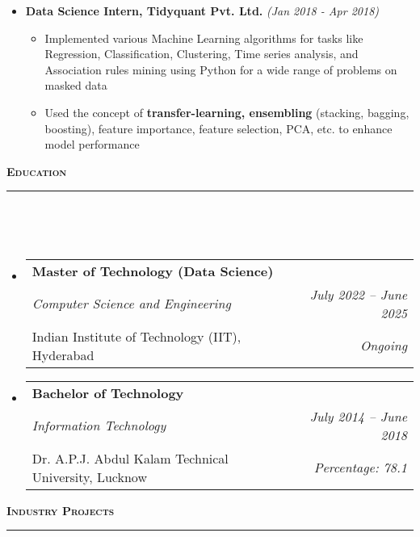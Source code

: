 \documentclass[a4paper,10pt]{article}
\makeatletter
\newcommand{\isep}{-2 pt}
\newcommand{\lsep}{-0.5cm}
\newcommand{\resheading}[1]{{\small
        {
            \begin{minipage}
                {0.992\textwidth}\textbf{{\textsc{#1 \vphantom{p\^{E}} }}}
                \\[-0.3cm]
                \hrule
            \end{minipage}
            \\[-0.5cm]
        }
 }}
\newcommand{\resEduHeading}[6]{
  \begin{tabular*}{7.1in}{l @{\extracolsep{\fill}} r}
    \textbf{\normalsize #1} \\
    \textit{#2} & \textit{#3} \\
    {\normalsize #4} & \textit{{#5} \textbf{#6}}
  \end{tabular*}
}
\makeatother
\begin{document}
\begin{itemize}
    \item \textbf{Data Science Intern, Tidyquant Pvt. Ltd.} \hfill {\emph{(Jan 2018 - Apr 2018)}}
    \\ [-0.6cm]
    \begin{itemize}\itemsep \isep
        \item Implemented various Machine Learning algorithms for tasks like Regression, Classification, Clustering, Time series analysis, and Association rules mining using Python for a wide range of problems on masked data 
        \item Used the concept of \textbf{transfer-learning, ensembling} (stacking, bagging, boosting), feature importance, feature selection, PCA, etc. to enhance model performance 
    \\ [-0.5cm]
    \end{itemize}
\end{itemize}
\vspace{4pt}
\noindent
\resheading{\textbf{\large Education}}\\[\lsep]
\vspace{8pt}
\begin{itemize}
    \item \resEduHeading{Master of Technology (Data Science)}
    {Computer Science and Engineering}
    {July 2022 -- June 2025}
    {Indian Institute of Technology (IIT), Hyderabad}
    {Ongoing}
    {}
    \item \resEduHeading{Bachelor of Technology}
    {Information Technology}
    {July 2014 -- June 2018}
    {Dr. A.P.J. Abdul Kalam Technical University, Lucknow}
    {Percentage: 78.1}
    {}
\end{itemize}
\vspace{2pt}
\noindent
\resheading{\textbf{\large Industry Projects}}\\[\lsep] 
\vspace{4pt}
\end{document}
